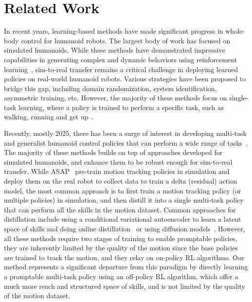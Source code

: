\section{Related Work}
\label{sec:appendix-related-work}

In recent years, learning-based methods have made significant progress in whole-body control for humanoid robots. The largest body of work has focused on simulated humanoids. While these methods have demonstrated impressive capabilities in generating complex and dynamic behaviors using reinforcement learning~\citep{PengALP18deepmimic,Luo2023phc,Luo2024universal,TesslerGNCP24}, sim-to-real transfer remains a critical challenge in deploying learned policies on real-world humanoid robots. Various strategies have been proposed to bridge this gap, including domain randomization, system identification, asymmetric training, etc. However, the majority of these methods focus on single-task learning, where a policy is trained to perform a specific task, such as walking, running and get up~\citep{RadosavovicXZDMS24,Radosavovic2024nexttoken,Chen2024lipschitz,Seo2025fasttd3,Zakka2025mujocoplayground,he2025learninggettinguppoliciesrealworld}.

Recently, mostly 2025, there has been a surge of interest in developing multi-task and generalist humanoid control policies that can perform a wide range of tasks~\citep{He2024hover,he2025asap,Zhang2025humanoidreaching,zeng2025behaviorfoundationmodelhumanoid,Yin2025unitracker, Chen2025gmt}. The majority of these methods builds on top of approaches developed for simulated humanoids, and enhance them to be robust enough for sim-to-real transfer.
While ASAP~\citep{he2025asap} pre-train motion tracking policies in simulation and deploy them on the real robot to collect data to train a delta (residual) action model, the most common approach is to first train a motion tracking policy (or multiple policies) in simulation, and then distill it into a single multi-task policy that can perform all the skills in the motion dataset.
Common approaches for distillation include using a conditional variational autoencoder to learn a latent space of skills and doing online distillation~\citep{He2024hover,Yin2025unitracker,zeng2025behaviorfoundationmodelhumanoid,Chen2025gmt, Zhang2025humanoidreaching} or using diffusion models~\citep{liao2025beyondmimic}. However, all these methods require two stages of training to enable promptable policies, they are inherently limited by the quality of the motion since the base policies are trained to track the motion, and they relay on on-policy RL algorithms. Our method represents a significant departure from this paradigm by directly learning a promptable multi-task policy using an off-policy RL algorithm, which offer a much more reach and structured space of skills, and is not limited by the quality of the motion dataset.



